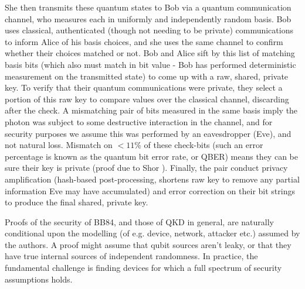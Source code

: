 \documentclass[9pt,technote]{IEEEtran}
\begin{document}
She then transmits these quantum states to Bob via a quantum communication channel, who measures each in uniformly and independently random basis. Bob uses classical, authenticated (though not needing to be private) communications to inform Alice of his basis choices, and she uses the same channel to confirm whether their choices matched or not. Bob and Alice sift by this list of matching basis bits (which also must match in bit value - Bob has performed deterministic measurement on the transmitted state) to come up with a raw, shared, private key. To verify that their quantum communications were private, they select a portion of this raw key to compare values over the classical channel, discarding after the check. A mismatching pair of bits measured in the same basis imply the photon was subject to some destructive interaction in the channel, and for security purposes we assume this was performed by an eavesdropper (Eve), and not natural loss. Mismatch on $<11\%$ of these check-bits (such an error percentage is known as the quantum bit error rate, or QBER) means they can be sure their key is private (proof due to Shor \cite{Shor_2000}). Finally, the pair conduct privacy amplification (hash-based post-processing, shortens raw key to remove any partial information Eve may have accumulated) and error correction on their bit strings to produce the final shared, private key.

Proofs of the security of BB84, and those of QKD in general, are naturally conditional upon the modelling (of e.g. device, network, attacker etc.) assumed by the authors. A proof might assume that qubit sources aren't leaky, or that they have true internal sources of independent randomness. In practice, the fundamental challenge is finding devices for which a full spectrum of security assumptions holds.
\end{document}

